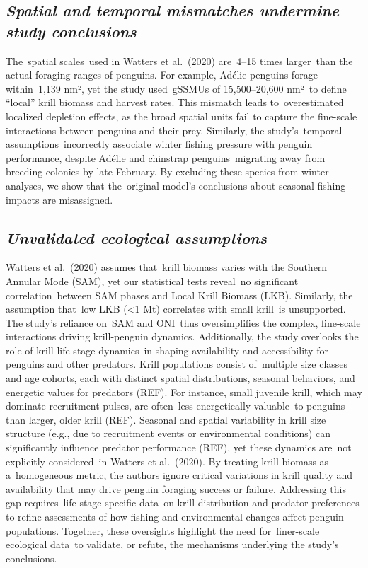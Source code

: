 \documentclass[]{elsarticle} %
\begin{document}
\subsection{\texorpdfstring{\emph{Spatial and temporal mismatches
undermine study
conclusions}}{Spatial and temporal mismatches undermine study conclusions}}\label{spatial-and-temporal-mismatches-undermine-study-conclusions}

The~spatial scales~used in Watters et al.~(2020) are~4--15 times
larger~than the actual foraging ranges of penguins. For example, Adélie
penguins forage within~1,139 nm², yet the study used~gSSMUs of
15,500--20,600 nm²~to define ``local'' krill biomass and harvest rates.
This mismatch leads to~overestimated localized depletion effects, as the
broad spatial units fail to capture the fine-scale interactions between
penguins and their prey. Similarly, the study's~temporal
assumptions~incorrectly associate winter fishing pressure with penguin
performance, despite Adélie and chinstrap penguins~migrating away from
breeding colonies by late February. By excluding these species from
winter analyses, we show that the~original model's conclusions about
seasonal fishing impacts are misassigned.

\subsection{\texorpdfstring{\emph{Unvalidated ecological
assumptions}}{Unvalidated ecological assumptions}}\label{unvalidated-ecological-assumptions-2}

Watters et al.~(2020) assumes that~krill biomass varies with the
Southern Annular Mode (SAM), yet our statistical tests reveal~no
significant correlation~between SAM phases and Local Krill Biomass
(LKB). Similarly, the assumption that~low LKB (\textless1 Mt) correlates
with small krill~is unsupported. The study's reliance on~SAM and
ONI~thus oversimplifies the complex, fine-scale interactions driving
krill-penguin dynamics. Additionally, the study overlooks the role of
krill life-stage dynamics~in shaping availability and accessibility for
penguins and other predators. Krill populations consist of~multiple size
classes and age cohorts, each with distinct spatial distributions,
seasonal behaviors, and energetic values for predators (REF). For
instance, small juvenile krill, which may dominate recruitment pulses,
are often~less energetically valuable~to penguins than larger, older
krill (REF). Seasonal and spatial variability in krill size structure
(e.g., due to recruitment events or environmental conditions) can
significantly influence predator performance (REF), yet these dynamics
are~not explicitly considered~in Watters et al.~(2020). By treating
krill biomass as a~homogeneous metric, the authors ignore critical
variations in krill quality and availability that may drive penguin
foraging success or failure. Addressing this gap
requires~life-stage-specific data~on krill distribution and predator
preferences to refine assessments of how fishing and environmental
changes affect penguin populations. Together, these oversights highlight
the need for~finer-scale ecological data~to validate, or refute, the
mechanisms underlying the study's conclusions.
\end{document}
